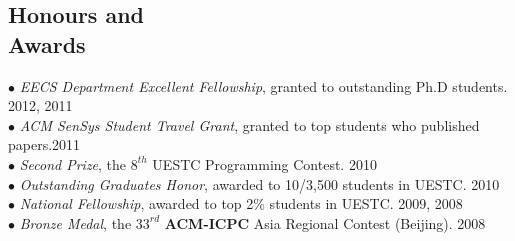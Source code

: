 \documentclass[margin, centered]{resume}
\begin{document}
\begin{resume}



    \section{\mysidestyle Honours and\\Awards} 

    $\bullet$ \textsl{EECS Department Excellent Fellowship}, granted to outstanding Ph.D students. \hfill 2012, 2011\vspace{0mm}\\%
    $\bullet$ \textsl{ACM SenSys Student Travel Grant}, granted to top students who published papers.\hfill 2011\vspace{0mm}\\%
    $\bullet$ \textsl{Second Prize}, the $8^{th}$ UESTC Programming Contest. \hfill 2010\vspace{0mm}\\%
    $\bullet$ \textsl{Outstanding Graduates Honor}, awarded to 10/3,500 students in UESTC. \hfill 2010\vspace{0mm}\\%
    $\bullet$ \textsl{National Fellowship}, awarded to top 2\% students in UESTC. \hfill 2009, 2008\vspace{0mm}\\%
    $\bullet$ \textsl{Bronze Medal}, the $33^{rd}$ \textbf{ACM-ICPC} Asia Regional Contest (Beijing). \hfill 2008\vspace{-5mm}\\ 


\end{resume}
\end{document}
